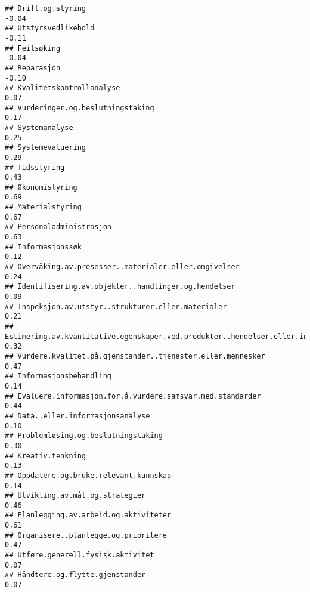 \documentclass[
]{article}
\begin{document}
\begin{verbatim}
## Drift.og.styring                                                                 -0.04
## Utstyrsvedlikehold                                                               -0.11
## Feilsøking                                                                       -0.04
## Reparasjon                                                                       -0.10
## Kvalitetskontrollanalyse                                                          0.07
## Vurderinger.og.beslutningstaking                                                  0.17
## Systemanalyse                                                                     0.25
## Systemevaluering                                                                  0.29
## Tidsstyring                                                                       0.43
## Økonomistyring                                                                    0.69
## Materialstyring                                                                   0.67
## Personaladministrasjon                                                            0.63
## Informasjonssøk                                                                   0.12
## Overvåking.av.prosesser..materialer.eller.omgivelser                              0.24
## Identifisering.av.objekter..handlinger.og.hendelser                               0.09
## Inspeksjon.av.utstyr..strukturer.eller.materialer                                 0.21
## Estimering.av.kvantitative.egenskaper.ved.produkter..hendelser.eller.informasjon  0.32
## Vurdere.kvalitet.på.gjenstander..tjenester.eller.mennesker                        0.47
## Informasjonsbehandling                                                            0.14
## Evaluere.informasjon.for.å.vurdere.samsvar.med.standarder                         0.44
## Data..eller.informasjonsanalyse                                                   0.10
## Problemløsing.og.beslutningstaking                                                0.30
## Kreativ.tenkning                                                                  0.13
## Oppdatere.og.bruke.relevant.kunnskap                                              0.14
## Utvikling.av.mål.og.strategier                                                    0.46
## Planlegging.av.arbeid.og.aktiviteter                                              0.61
## Organisere..planlegge.og.prioritere                                               0.47
## Utføre.generell.fysisk.aktivitet                                                  0.07
## Håndtere.og.flytte.gjenstander                                                    0.07

\end{verbatim}
\end{document}
